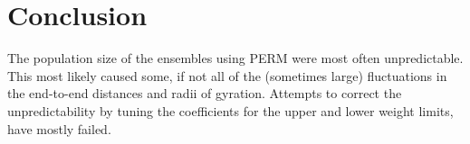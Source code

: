 \section{Conclusion}


The population size of the ensembles using PERM were most often unpredictable. This most likely caused some, if not all of the (sometimes large) fluctuations in the end-to-end distances and radii of gyration. Attempts to correct the unpredictability by tuning the coefficients for the upper and lower weight limits, have mostly failed.